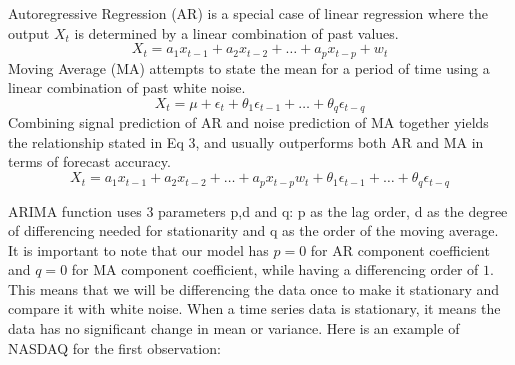 \documentclass{article}[12pt]
\begin{document}
        Autoregressive Regression (AR) is a special case of linear regression where the output $X_t$ is determined by a linear combination of past values.
        \begin{equation}
            X_t = a_1 x_{t-1} +a_2 x_{t-2} + \dots +a_p x_{t-p} +w_t 
        \end{equation}
        Moving Average (MA) attempts to state the mean for a period of time using a linear combination of past white noise. 
        \begin{equation}
            X_t = \mu + \epsilon_t + \theta_1 \epsilon_{t-1} + \dots + \theta_q \epsilon_{t-q}
        \end{equation}
        Combining signal prediction of AR and noise prediction of MA together yields the relationship stated in Eq 3, and usually outperforms both AR and MA in terms of forecast accuracy. 
        \begin{equation}
            X_t = a_1 x_{t-1} +a_2 x_{t-2} + \dots +a_p x_{t-p}w_t +  \theta_1 \epsilon_{t-1} + \dots + \theta_q \epsilon_{t-q}
        \end{equation}

		ARIMA function uses 3 parameters p,d and q: p as the lag order, d as the degree of differencing needed for stationarity and q as the order of the moving average.
	    It is important to note that our model has $p=0$ for AR component coefficient and $q=0$ for MA component coefficient, while having a differencing order of $1$. This means that we will be differencing the data once to make it stationary and compare it with white noise. When a time series data is stationary, it means the data has no significant change in mean or variance. Here is an example of NASDAQ for the first observation:
\end{document}
